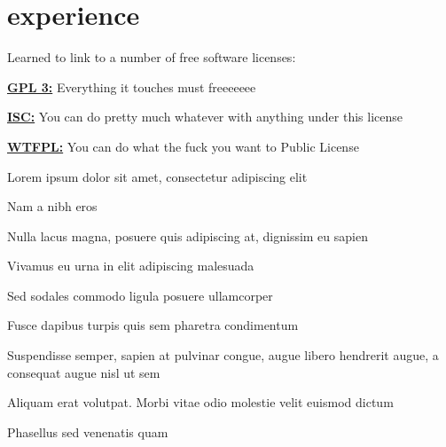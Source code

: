 \documentclass{resume}
\begin{document}
%
\address{123 Madeupstreet, Made Up City, MU 01234}
\maketitle
%
\section{experience}
%
\begin{position}
	\begin{compactitem}
		\item
			Learned to link to a number of free software licenses:
			\begin{compactitem}
				\item
					\href{http://www.gnu.org/licenses/gpl.html}{\bf{GPL 3:}} Everything it touches must freeeeeee
				\item
					\href{http://directory.fsf.org/wiki/License:ISC}{\bf{ISC:}} You can do pretty much whatever with anything under this license
				\item
					\href{http://sam.zoy.org/wtfpl/}{\bf{WTFPL:}} You can do what the fuck you want to Public License
			\end{compactitem}
	\end{compactitem}
\end{position}
\begin{position}
	\begin{compactitem}
		\item
			Lorem ipsum dolor sit amet, consectetur adipiscing elit
			\begin{compactitem}
				\item
					Nam a nibh eros
				\item
					Nulla lacus magna, posuere quis adipiscing at, dignissim eu sapien
				\item
					Vivamus eu urna in elit adipiscing malesuada
			\end{compactitem}
		\item
			Sed sodales commodo ligula posuere ullamcorper
			\begin{compactitem}
				\item
					Fusce dapibus turpis quis sem pharetra condimentum
				\item
					Suspendisse semper, sapien at pulvinar congue, augue libero hendrerit augue, a consequat augue nisl ut sem
				\item
					Aliquam erat volutpat. Morbi vitae odio molestie velit euismod dictum
			\end{compactitem}
		\item
			Phasellus sed venenatis quam
	\end{compactitem}
\end{position}
\end{document}

